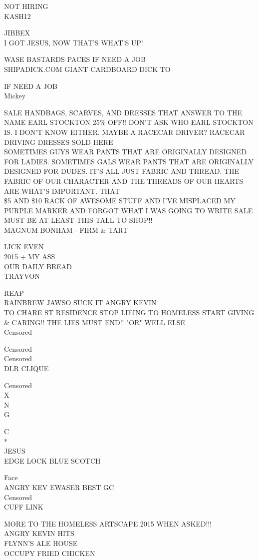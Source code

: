 \documentclass[10pt,letterpaper]{article}
\begin{document}
NOT HIRING\\
KASH12

JIBBEX\\
I GOT JESUS, NOW THAT'S WHAT'S UP!

WASE BASTARDS PACES IF NEED A JOB\\
SHIPADICK.COM GIANT CARDBOARD DICK TO

IF NEED A JOB\\
Mickey

SALE HANDBAGS, SCARVES, AND DRESSES THAT ANSWER TO THE NAME EARL STOCKTON 25\% OFF!!  DON'T ASK WHO EARL STOCKTON IS.  I DON'T KNOW EITHER.  MAYBE A RACECAR DRIVER?  RACECAR DRIVING DRESSES SOLD HERE\\
SOMETIMES GUYS WEAR PANTS THAT ARE ORIGINALLY DESIGNED FOR LADIES.  SOMETIMES GALS WEAR PANTS THAT ARE ORIGINALLY DESIGNED FOR DUDES.  IT'S ALL JUST FABRIC AND THREAD.  THE FABRIC OF OUR CHARACTER AND THE THREADS OF OUR HEARTS ARE WHAT'S IMPORTANT.  THAT\\
\$5 AND \$10 RACK OF AWESOME STUFF AND I'VE MISPLACED MY PURPLE MARKER AND FORGOT WHAT I WAS GOING TO WRITE SALE MUST BE AT LEAST THIS TALL TO SHOP!!\\
MAGNUM BONHAM {-} FIRM \& TART

LICK EVEN\\
2015 + MY ASS\\
OUR DAILY BREAD\\
TRAYVON

REAP\\
RAINBREW JAWSO SUCK IT ANGRY KEVIN\\
TO CHARE ST RESIDENCE STOP LIEING TO HOMELESS START GIVING \& CARING!! THE LIES MUST END!! "OR" WELL ELSE\\
Censored

Censored\\
Censored\\
DLR CLIQUE

Censored\\
X\\
N\\
G

C\\
*\\
JESUS\\
EDGE LOCK BLUE SCOTCH

Face\\
ANGRY KEV EWASER BEST GC\\
Censored\\
CUFF LINK

MORE TO THE HOMELESS ARTSCAPE 2015 WHEN ASKED!!!\\
ANGRY KEVIN HITS\\
FLYNN'S ALE HOUSE\\
OCCUPY FRIED CHICKEN
\end{document}

